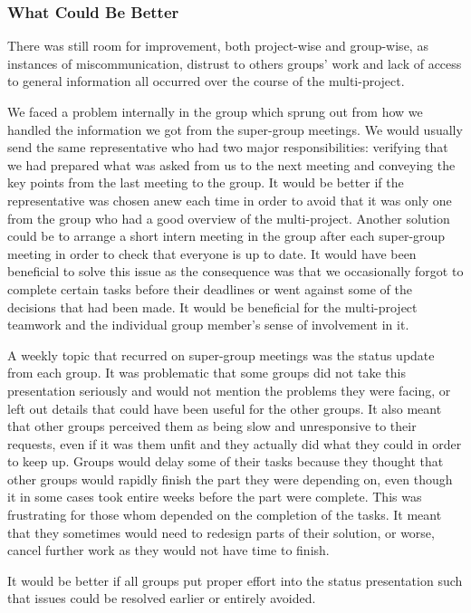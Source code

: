 \subsubsection*{What Could Be Better}
There was still room for improvement, both project-wise and group-wise, as instances of miscommunication, distrust to others groups' work and lack of access to general information all occurred over the course of the multi-project.

We faced a problem internally in the group which sprung out from how we handled the information we got from the super-group meetings. We would usually send the same representative who had two major responsibilities: verifying that we had prepared what was asked from us to the next meeting and conveying the key points from the last meeting to the group. It would be better if the representative was chosen anew each time in order to avoid that it was only one from the group who had a good overview of the multi-project. Another solution could be to arrange a short intern meeting in the group after each super-group meeting in order to check that everyone is up to date. It would have been beneficial to solve this issue as the consequence was that we occasionally forgot to complete certain tasks before their deadlines or went against some of the decisions that had been made. It would be beneficial for the  multi-project teamwork and the individual group member's sense of involvement in it.

A weekly topic that recurred on super-group meetings was the status update from each group. It was problematic that some groups did not take this presentation seriously and would not mention the problems they were facing, or left out details that could have been useful for the other groups. It also meant that other groups perceived them as being slow and unresponsive to their requests, even if it was them unfit and they actually did what they could in order to keep up. Groups would delay some of their tasks because they thought that other groups would rapidly finish the part they were depending on, even though it in some cases took entire weeks before the part were complete. This was frustrating for those whom depended on the completion of the tasks. It meant that they sometimes would need to redesign parts of their solution, or worse, cancel further work as they would not have time to finish.

It would be better if all groups put proper effort into the status presentation such that issues could be resolved earlier or entirely avoided.


